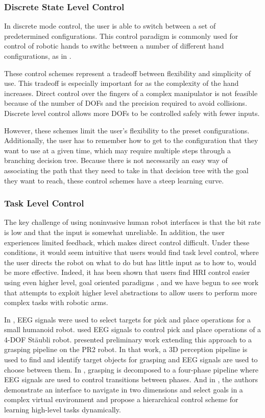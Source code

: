 \subsubsection{Discrete State Level Control}
In discrete mode control, the user is able to switch between a set of predetermined configurations. This control paradigm is commonly used for control of robotic hands to swithc between a number of different hand configurations, as in \cite{Yang2009a,Woczowski2010,Ho2011,Cipriani2008,Matrone2011}.

 These control schemes represent a tradeoff between flexibility and simplicity of use. This tradeoff is especially important for as the complexity of the hand increases. Direct control over the fingers of a complex manipulator is not feasible because of the number of DOFs and the precision required to avoid collisions. Discrete level control allows more DOFs to be controlled safely with fewer inputs.

However, these schemes limit the user's flexibility to the preset configurations. Additionally, the user has to remember how to get to the configuration that they want to use at a given time, which may require multiple steps through a branching decision tree.  Because there is not necessarily an easy way of associating the path that they need to take in that decision tree with the goal they want to reach, these control schemes have a steep learning curve. 

\subsubsection{Task Level Control}
The key challenge of using noninvasive human robot interfaces is that the bit rate is low and that the input is somewhat unreliable. In addition, the user experiences limited feedback, which makes direct control difficult.  Under these conditions, it would seem intuitive that users would find task level control, where the user directs the robot on what to do but has little input as to how to, would be more effective. Indeed,  it has been shown that users find HRI control easier using even higher level, goal oriented paradigms \cite{Royer2011}, and we have begun to see work that attempts to exploit higher level abstractions to allow users to perform more complex tasks with robotic arms. 

In \cite{Bell2008}, EEG signals were used to select targets for pick and place operations for a small humanoid robot. \cite{Waytowich} used EEG signals to control pick and place operations of a 4-DOF St\"{a}ubli robot. \cite{M.BryanV.ThomasG.NicollL.Chang2011} presented preliminary work extending this approach to a grasping pipeline on the PR2 robot. In that work, a 3D perception pipeline is used to find and identify target objects for grasping and EEG signals are used to choose between them. In \cite{Muller-Putz2005}, grasping is decomposed to a four-phase pipeline where EEG signals are used to control transitions between phases. And in \cite{Scherer2011a}, the authors demonstrate an interface to navigate in two dimensions and select goals in a complex virtual environment and propose a hierarchical control scheme for learning high-level tasks dynamically. 

